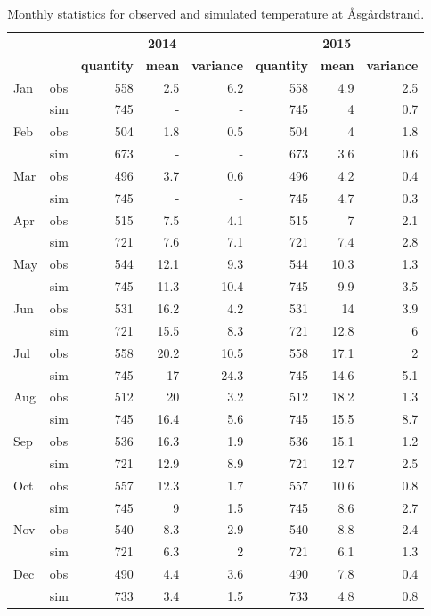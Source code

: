 \begin{table}
\caption{Monthly statistics for observed and simulated temperature at \AA sg\aa rdstrand.}
\label{tab:temp}
\centering
\begin{tabular}{|ll|rrr|rrr|}
\hline 
&& \multicolumn{3}{|c|}{\bf 2014} & \multicolumn{3}{|c|}{\bf 2015} \\
&& {\bf quantity} & {\bf mean} & {\bf variance}  
& {\bf quantity} & {\bf mean} & {\bf variance} \\ \hline 
\small Jan & obs & 558 & 2.5 & 6.2 & 558 & 4.9 & 2.5 \\
\small     & sim & 745 & - & - & 745 & 4 & 0.7 \\
\small Feb & obs & 504 & 1.8 & 0.5 & 504 & 4 & 1.8 \\
\small     & sim & 673 & - & - & 673 & 3.6 & 0.6 \\
\small Mar & obs & 496 & 3.7 & 0.6 & 496 & 4.2 & 0.4 \\
\small     & sim & 745 & - & - & 745 & 4.7 & 0.3 \\
\small Apr & obs & 515 & 7.5 & 4.1 & 515 & 7 & 2.1 \\
\small     & sim & 721 & 7.6 & 7.1 & 721 & 7.4 & 2.8 \\
\small May & obs & 544 & 12.1 & 9.3 & 544 & 10.3 & 1.3 \\
\small     & sim & 745 & 11.3 & 10.4 & 745 & 9.9 & 3.5 \\
\small Jun & obs & 531 & 16.2 & 4.2 & 531 & 14 & 3.9 \\
\small     & sim & 721 & 15.5 & 8.3 & 721 & 12.8 & 6 \\
\small Jul & obs & 558 & 20.2 & 10.5 & 558 & 17.1 & 2 \\
\small     & sim & 745 & 17 & 24.3 & 745 & 14.6 & 5.1 \\
\small Aug & obs & 512 & 20 & 3.2 & 512 & 18.2 & 1.3 \\
\small     & sim & 745 & 16.4 & 5.6 & 745 & 15.5 & 8.7 \\
\small Sep & obs & 536 & 16.3 & 1.9 & 536 & 15.1 & 1.2 \\
\small     & sim & 721 & 12.9 & 8.9 & 721 & 12.7 & 2.5 \\
\small Oct & obs & 557 & 12.3 & 1.7 & 557 & 10.6 & 0.8 \\
\small     & sim & 745 & 9 & 1.5 & 745 & 8.6 & 2.7 \\
\small Nov & obs & 540 & 8.3 & 2.9 & 540 & 8.8 & 2.4 \\
\small     & sim & 721 & 6.3 & 2 & 721 & 6.1 & 1.3 \\
\small Dec & obs & 490 & 4.4 & 3.6 & 490 & 7.8 & 0.4 \\
\small     & sim & 733 & 3.4 & 1.5 & 733 & 4.8 & 0.8 \\
\hline
\end{tabular}
\end{table}

